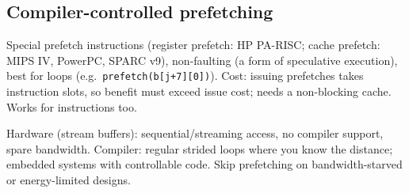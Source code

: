\subsection{Compiler-controlled prefetching}
Special prefetch instructions (register prefetch: HP PA-RISC; cache prefetch: MIPS IV, PowerPC, SPARC v9), non-faulting (a form of speculative execution), best for loops (e.g.\ \texttt{prefetch(b[j+7][0])}). Cost: issuing prefetches takes instruction slots, so benefit must exceed issue cost; needs a non-blocking cache. Works for instructions too.

\begin{dec}
Hardware (stream buffers): sequential/streaming access, no compiler support, spare bandwidth. Compiler: regular strided loops where you know the distance; embedded systems with controllable code. Skip prefetching on bandwidth-starved or energy-limited designs.
\end{dec}

